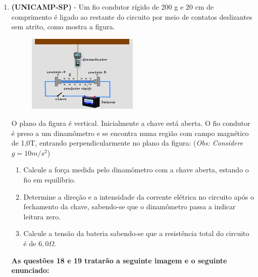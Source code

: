 \documentclass[12pt,letterpaper,fleqn]{article}
\begin{document}
\begin{itemize}
\begin{enumerate}
            \item \textbf{(UNICAMP-SP)} - Um fio condutor rígido de 200 g e 20 cm de comprimento é ligado ao restante do circuito por meio de contatos deslizantes sem atrito, como mostra a figura.
            
            \begin{figure}[h]
                \centering
                \includegraphics[width=0.5\textwidth]{ex_17_forca.jpg}
            \end{figure}
            
             O plano da figura é vertical. Inicialmente a chave está aberta. O fio condutor é preso a um dinamômetro e se encontra numa região com campo magnético de 1,0T, entrando perpendicularmente no plano da figura: (\textit{Obs: Considere $g=10m/s^2$})
             
             \begin{enumerate}
                 \item Calcule a força medida pelo dinamômetro com a chave aberta, estando o fio em equilíbrio.
                 \item Determine a direção e a intensidade da corrente elétrica no circuito após o fechamento da chave, sabendo-se que o dinamômetro passa a indicar leitura zero.
                 \item Calcule a tensão da bateria sabendo-se que a resistência total do circuito é de $6,0\Omega$.
             \end{enumerate}
             
             {\large \textbf{As questões 18 e 19 tratarão a seguinte imagem e o seguinte enunciado:}}
             

\end{enumerate}
\end{itemize}
\end{document}
